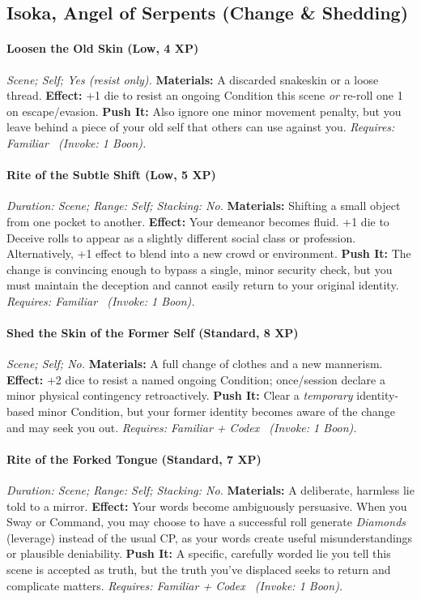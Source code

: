 \subsection{Isoka, Angel of Serpents (Change \& Shedding)}
\paragraph{Loosen the Old Skin (Low, 4 XP)} \emph{Scene; Self; Yes (resist only).}
\textbf{Materials:} A discarded snakeskin or a loose thread.
\textbf{Effect:} +1 die to resist an ongoing Condition this scene \emph{or} re-roll one 1 on escape/evasion.
\textbf{Push It:} Also ignore one minor movement penalty, but you leave behind a piece of your old self that others can use against you.
\emph{Requires: Familiar \ (\textit{Invoke:} 1 Boon).}
\paragraph{Rite of the Subtle Shift (Low, 5 XP)} \emph{Duration: Scene; Range: Self; Stacking: No.}
\textbf{Materials:} Shifting a small object from one pocket to another.
\textbf{Effect:} Your demeanor becomes fluid. +1 die to Deceive rolls to appear as a slightly different social class or profession. Alternatively, +1 effect to blend into a new crowd or environment.
\textbf{Push It:} The change is convincing enough to bypass a single, minor security check, but you must maintain the deception and cannot easily return to your original identity.
\emph{Requires: Familiar \ (\textit{Invoke:} 1 Boon).}
\paragraph{Shed the Skin of the Former Self (Standard, 8 XP)} \emph{Scene; Self; No.}
\textbf{Materials:} A full change of clothes and a new mannerism.
\textbf{Effect:} +2 dice to resist a named ongoing Condition; once/session declare a minor physical contingency retroactively.
\textbf{Push It:} Clear a \emph{temporary} identity-based minor Condition, but your former identity becomes aware of the change and may seek you out.
\emph{Requires: Familiar + Codex \ (\textit{Invoke:} 1 Boon).}
\paragraph{Rite of the Forked Tongue (Standard, 7 XP)} \emph{Duration: Scene; Range: Self; Stacking: No.}
\textbf{Materials:} A deliberate, harmless lie told to a mirror.
\textbf{Effect:} Your words become ambiguously persuasive. When you Sway or Command, you may choose to have a successful roll generate \emph{Diamonds} (leverage) instead of the usual CP, as your words create useful misunderstandings or plausible deniability.
\textbf{Push It:} A specific, carefully worded lie you tell this scene is accepted as truth, but the truth you've displaced seeks to return and complicate matters.
\emph{Requires: Familiar + Codex \ (\textit{Invoke:} 1 Boon).}
